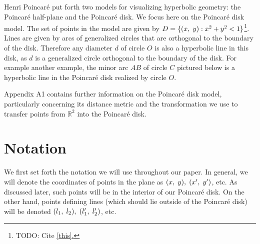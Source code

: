 \documentclass[12pt]{article}
\newcommand{\R}{\mathbb{R}}
\newcommand{\poincare}{Poincar\'{e} }
\newcommand{\ttc}{, \hspace{1mm}}
\theoremstyle{plain}
\theoremstyle{definition}
\begin{document}
Henri \poincare put forth two models for visualizing hyperbolic geometry: the \poincare half-plane and the \poincare disk. We focus here on the \poincare disk model. The set of points in the model are given by $D = \{(x\ttc y): x^2 + y^2 < 1\}$\footnote{TODO: Cite \href{http://math2.uncc.edu/~frothe/3181alllhyp1_7.pdf}{[this].}}. Lines are given by arcs of generalized circles that are orthogonal to the boundary of the disk. Therefore any diameter $d$ of circle $O$ is also a hyperbolic line in this disk, as $d$ is a generalized circle orthogonal to the boundary of the disk. For example another example, the minor arc $AB$ of circle $C$ pictured below is a hyperbolic line in the \poincare disk realized by circle $O$. 

\begin{center}
\end{center}
	
Appendix A1 contains further information on the \poincare disk model, particularly concerning its distance metric and the transformation we use to transfer points from $\R^2$ into the \poincare disk.





	
\section{Notation}
	
\hspace{10mm} We first set forth the notation we will use throughout our paper. In general, we will denote the coordinates of points in the plane as $(x \ttc y) \ttc (x' \ttc y')$, etc. As discussed later, such points will be in the interior of our \poincare disk. On the other hand, points defining lines (which should lie outside of the \poincare disk) will be denoted $(l_1 \ttc l_2) \ttc (l_1' \ttc l_2')$, etc. 
\end{document}
